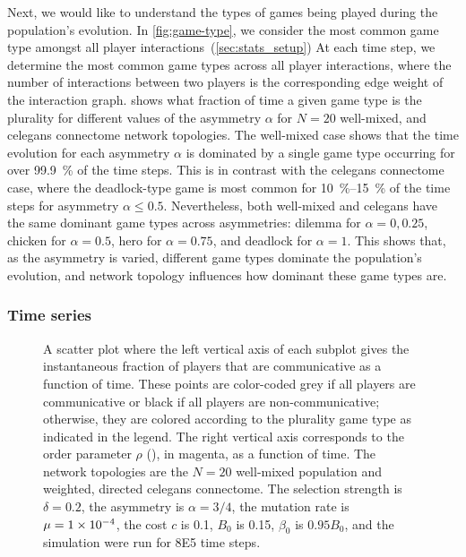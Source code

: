 \documentclass[pdflatex,lineno,referee,sn-mathphys-ay]{sn-jnl}
\begin{document}
Next, we would like to understand the types of games being played
during the population's evolution.
In \cref{fig:game-type}, we consider the most common game type
amongst all player interactions~(\cf \cref{sec:stats_setup})
At each time step, we determine the most common game types
across all player interactions,
where the number of interactions between two players
is the corresponding edge weight of the interaction graph.
 shows what fraction of time
a given game type is the plurality for different values
of the asymmetry $\alpha$ for
$N=20$ well-mixed,
and
\gls{celegans} connectome
network topologies.
The  well-mixed case
shows that the time evolution for each asymmetry $\alpha$
is dominated by a single game type
occurring for over \SI{99.9}{\percent} of the time steps.
This is in contrast with the
 \gls{celegans} connectome case,
where the deadlock-type game is most common
for \SIrange{10}{15}{\percent} of the time steps
for asymmetry $\alpha \le 0.5$.
Nevertheless, both  well-mixed
and  \gls{celegans}
have the same dominant game types
across asymmetries:
dilemma for $\alpha = 0, 0.25$, chicken for $\alpha = 0.5$,
hero for $\alpha = 0.75$, and deadlock for $\alpha = 1$.
This shows that, as the asymmetry is varied,
different game types dominate the population's evolution,
and network topology influences how dominant these game types are.

\subsubsection{Time series}
\begin{figure}
  \centering
  
  \caption{
    A scatter plot where
    the left vertical axis of each subplot gives
    the instantaneous fraction of players that are communicative
    as a function of time.
    These points are color-coded
    grey if all players are communicative or
    black if all players are non-communicative;
    otherwise, they are colored according
    to the plurality game type as indicated in the legend.
    The right vertical axis corresponds to the order parameter $\rho$
    (), in magenta, as a function of time.
    The network topologies are the
    $N=20$ well-mixed population
    and
    weighted, directed \gls{celegans} connectome.
    The selection strength is $\delta=0.2$,
    the asymmetry is $\alpha=3/4$,
    the mutation rate is $\mu=\num{1E-4}$,
    the cost $c$ is \num{0.1},
    $B_0$ is \num{0.15},
    $\beta_0$ is $\num{0.95} B_0$,
    and the simulation were run for \num{8E5} time steps.
  }
  \label{fig:time-series}
\end{figure}
\end{document}
